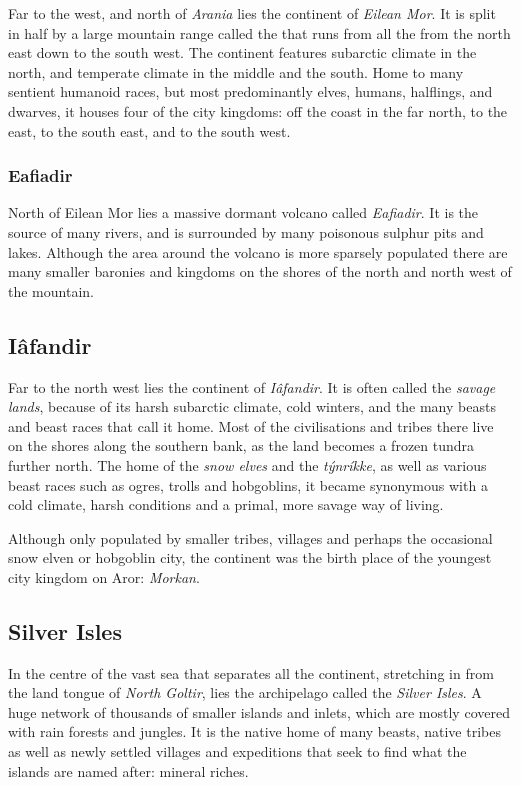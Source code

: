 Far to the west, and north of \emph{Arania} lies the continent of \emph{Eilean
  Mor}. It is split in half by a large mountain range called the
 that runs from all the from the north east down to
the south west.  The continent features subarctic climate in the north, and
temperate climate in the middle and the south. Home to many sentient humanoid
races, but most predominantly elves, humans, halflings, and dwarves, it houses
four of the city kingdoms:  off the coast in the far
north,  to the east,  to the
south east, and  to the south west.

\subsubsection{Eafiadir}
\label{sec:Eafiadir}

North of Eilean Mor lies a massive dormant volcano called \emph{Eafiadir}. It
is the source of many rivers, and is surrounded by many poisonous sulphur pits
and lakes. Although the area around the volcano is more sparsely populated
there are many smaller baronies and kingdoms on the shores of the north and
north west of the mountain.

\subsection{Iâfandir}
\label{sec:Iafandir}

Far to the north west lies the continent of \emph{Iâfandir}. It is often called
the \emph{savage lands}, because of its harsh subarctic climate, cold winters,
and the many beasts and beast races that call it home. Most of the civilisations
and tribes there live on the shores along the southern bank, as the land becomes
a frozen tundra further north. The home of the \emph{snow elves} and the
\emph{týnríkke}, as well as various beast races such as ogres, trolls and
hobgoblins, it became synonymous with a cold climate, harsh conditions and a
primal, more savage way of living.

Although only populated by smaller tribes, villages and perhaps the occasional
snow elven or hobgoblin city, the continent was the birth place of the youngest
city kingdom on Aror: \emph{Morkan}.

\subsection{Silver Isles}

In the centre of the vast sea that separates all the continent, stretching in
from the land tongue of \emph{North Goltir}, lies the archipelago called the
\emph{Silver Isles}. A huge network of thousands of smaller islands and inlets,
which are mostly covered with rain forests and jungles. It is the native home
of many beasts, native tribes as well as newly settled villages and expeditions
that seek to find what the islands are named after: mineral riches.
